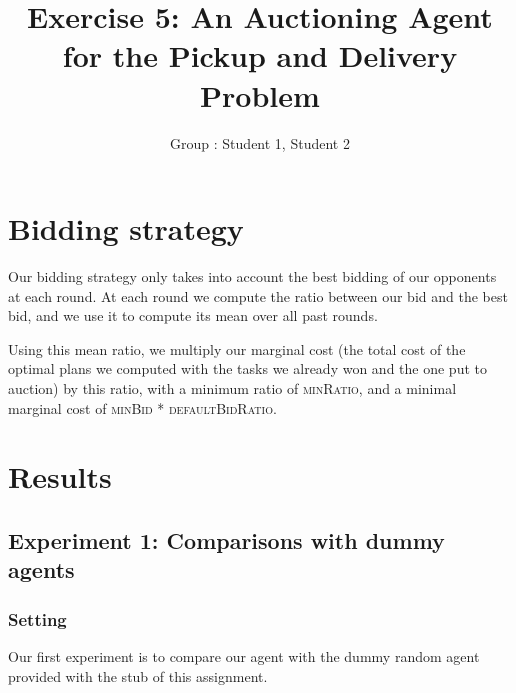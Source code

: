 \documentclass[11pt]{article}
\title{\bf Exercise 5: An Auctioning Agent for the Pickup and Delivery Problem}
\author{Group \textnumero: Student 1, Student 2}
\begin{document}
\maketitle

\section{Bidding strategy}
Our bidding strategy only takes into account the best bidding of our opponents at each round. At each round we compute the ratio between our bid and the best bid, and we use it to compute its mean over all past rounds.

Using this mean ratio, we multiply our marginal cost (the total cost of the optimal plans we computed with the tasks we already won and the one put to auction) by this ratio, with a minimum ratio of \textsc{minRatio}, and a minimal marginal cost of \textsc{minBid} * \textsc{defaultBidRatio}.

\section{Results}

\subsection{Experiment 1: Comparisons with dummy agents}

\subsubsection{Setting}
Our first experiment is to compare our agent with the dummy random agent provided with the stub of this assignment.
\end{document}
